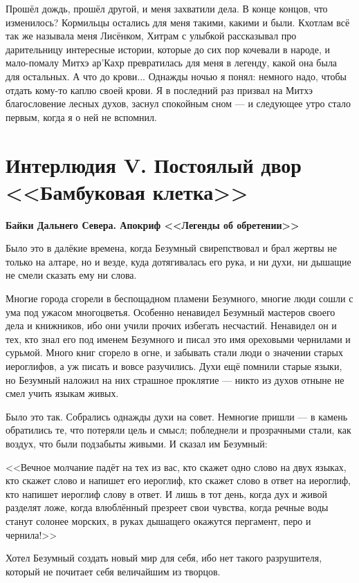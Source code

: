 Прошёл дождь, прошёл другой, и меня захватили дела.
В конце концов, что изменилось?
Кормильцы остались для меня такими, какими и были.
Кхотлам всё так же называла меня Лисёнком, Хитрам с улыбкой рассказывал про дарительницу интересные истории, которые до сих пор кочевали в народе, и мало-помалу Митхэ ар'Кахр превратилась для меня в легенду, какой она была для остальных.
А что до крови...
Однажды ночью я понял: немного надо, чтобы отдать кому-то каплю своей крови.
Я в последний раз призвал на Митхэ благословение лесных духов, заснул спокойным сном --- и следующее утро стало первым, когда я о ней не вспомнил.

\chapter*{Интерлюдия V. Постоялый двор <<Бамбуковая клетка>>}

\textbf{Байки Дальнего Севера.
Апокриф <<Легенды об обретении>>}

Было это в далёкие времена, когда Безумный свирепствовал и брал жертвы не только на алтаре, но и везде, куда дотягивалась его рука, и ни духи, ни дышащие не смели сказать ему ни слова.

Многие города сгорели в беспощадном пламени Безумного, многие люди сошли с ума под ужасом многоцветья.
Особенно ненавидел Безумный мастеров своего дела и книжников, ибо они учили прочих избегать несчастий.
Ненавидел он и тех, кто знал его под именем Безумного и писал это имя ореховыми чернилами и сурьмой.
Много книг сгорело в огне, и забывать стали люди о значении старых иероглифов, а уж писать и вовсе разучились.
Духи ещё помнили старые языки, но Безумный наложил на них страшное проклятие --- никто из духов отныне не смел учить языкам живых.

Было это так.
Собрались однажды духи на совет.
Немногие пришли --- в камень обратились те, что потеряли цель и смысл;
побледнели и прозрачными стали, как воздух, что были подзабыты живыми.
И сказал им Безумный:

<<Вечное молчание падёт на тех из вас, кто скажет одно слово на двух языках, кто скажет слово и напишет его иероглиф, кто скажет слово в ответ на иероглиф, кто напишет иероглиф слову в ответ.
И лишь в тот день, когда дух и живой разделят ложе, когда влюблённый презреет свои чувства, когда речные воды станут солонее морских, в руках дышащего окажутся пергамент, перо и чернила!>>

Хотел Безумный создать новый мир для себя, ибо нет такого разрушителя, который не почитает себя величайшим из творцов.

